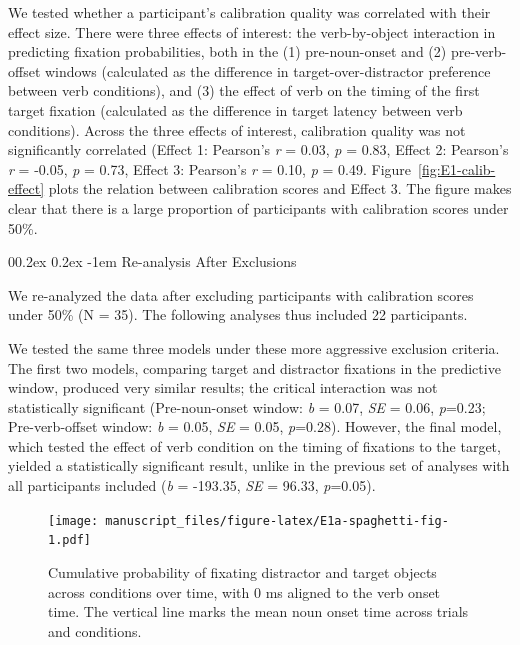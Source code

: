 \documentclass[
  man,floatsintext]{apa6}
\makeatletter
\let\oldparagraph\paragraph
\renewcommand{\paragraph}[1]{\oldparagraph{#1}\mbox{}}
\renewcommand{\paragraph}{\@startsection{paragraph}{4}{\parindent}%
  {0\baselineskip \@plus 0.2ex \@minus 0.2ex}%
  {-1em}%
  {\normalfont\normalsize\bfseries\itshape\typesectitle}}
\makeatother
\begin{document}
We tested whether a participant's calibration quality was correlated with their effect size. There were three effects of interest: the verb-by-object interaction in predicting fixation probabilities, both in the (1) pre-noun-onset and (2) pre-verb-offset windows (calculated as the difference in target-over-distractor preference between verb conditions), and (3) the effect of verb on the timing of the first target fixation (calculated as the difference in target latency between verb conditions). Across the three effects of interest, calibration quality was not significantly correlated (Effect 1: Pearson's \emph{r} = 0.03, \emph{p} = 0.83, Effect 2: Pearson's \emph{r} = -0.05, \emph{p} = 0.73, Effect 3: Pearson's \emph{r} = 0.10, \emph{p} = 0.49. Figure~\ref{fig:E1-calib-effect} plots the relation between calibration scores and Effect 3. The figure makes clear that there is a large proportion of participants with calibration scores under 50\%.

\paragraph{Re-analysis After Exclusions}\label{re-analysis-after-exclusions}

We re-analyzed the data after excluding participants with calibration scores under 50\% (N = 35). The following analyses thus included 22 participants.

We tested the same three models under these more aggressive exclusion criteria. The first two models, comparing target and distractor fixations in the predictive window, produced very similar results; the critical interaction was not statistically significant (Pre-noun-onset window: \emph{b} = 0.07, \emph{SE} = 0.06, \emph{p}=0.23; Pre-verb-offset window: \emph{b} = 0.05, \emph{SE} = 0.05, \emph{p}=0.28). However, the final model, which tested the effect of verb condition on the timing of fixations to the target, yielded a statistically significant result, unlike in the previous set of analyses with all participants included (\emph{b} = -193.35, \emph{SE} = 96.33, \emph{p}=0.05).

\begin{figure}
\centering
\texttt{[image: manuscript\_files/figure-latex/E1a-spaghetti-fig-1.pdf]}
\caption{\label{fig:E1a-spaghetti-fig}Cumulative probability of fixating distractor and target objects across conditions over time, with 0 ms aligned to the verb onset time. The vertical line marks the mean noun onset time across trials and conditions.}
\end{figure}
\end{document}
